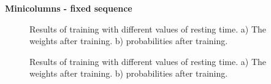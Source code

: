 \documentclass[10pt,a4paper]{article}
\begin{document}
\textbf{Minicolumns - fixed sequence}

\begin{figure}[H]
    \centering
    \qquad
    \caption{Results of training with different values of resting time. a) The weights after training. b) probabilities after training.}
    \label{fig:off_line_learning_minicolumns_fixed}%
\end{figure}

\begin{figure}[H]
    \centering
    \qquad
    \caption{Results of training with different values of resting time. a) The weights after training. b) probabilities after training.}
    \label{fig:off_line_learning_minicolumns_fixed2}%
\end{figure}
\end{document}
